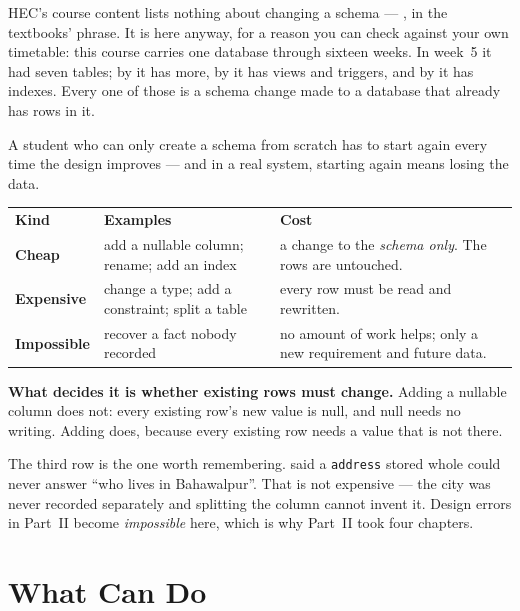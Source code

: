 HEC's course content lists nothing about changing a schema --- , in the textbooks' phrase. It is here anyway,
for a reason you can check against your own timetable: this course carries one
database through sixteen weeks. In week~5 it had seven tables; by
 it has more, by  it has views and triggers,
and by  it has indexes. Every one of those is a schema change
made to a database that already has rows in it.

A student who can only create a schema from scratch has to start again every
time the design improves --- and in a real system, starting again means losing
the data.

\begin{conceptbox}
\begin{tabular}{@{}L{3.6cm}L{4.6cm}L{5.8cm}@{}}
\textbf{Kind} & \textbf{Examples} & \textbf{Cost} \\
\textbf{Cheap} & add a nullable column; rename; add an index &
  a change to the \emph{schema only}. The rows are untouched. \\
\textbf{Expensive} & change a type; add a constraint; split a table &
  every row must be read and rewritten. \\
\textbf{Impossible} & recover a fact nobody recorded &
  no amount of work helps; only a new requirement and future data. \\
\end{tabular}

\smallskip
\textbf{What decides it is whether existing rows must change.} Adding a
nullable column does not: every existing row's new value is null, and null
needs no writing. Adding  does, because every existing row
needs a value that is not there.

\smallskip
The third row is the one worth remembering.  said a
\texttt{address} stored whole could never answer ``who lives in Bahawalpur''.
That is not expensive --- the city was never recorded separately and splitting
the column cannot invent it. Design errors in Part~II become \emph{impossible}
here, which is why Part~II took four chapters.
\end{conceptbox}

\section{What  Can Do}

